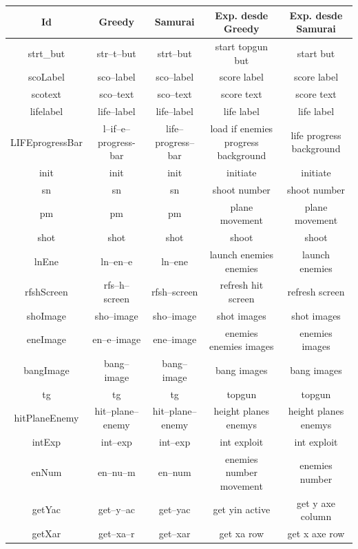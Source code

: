 \begin{table}
		\centering
   		\begin{tabular}{| c | c | c | c | c |}     
   		
       \hline
  	   \textbf{Id} & \textbf{Greedy} & \textbf{Samurai} & \textbf{Exp. desde Greedy} & \textbf{Exp. desde Samurai} \\ \hline
strt\_but&str--t--but&strt--but&start topgun but&start but\\ \hline
scoLabel&sco--label&sco--label&score label&score label\\ \hline
scotext&sco--text&sco--text&score text&score text\\ \hline
lifelabel&life--label&life--label&life label&life label\\ \hline
LIFEprogressBar&l--if--e--progress-bar&life--progress--bar& \shortstack{load if enemies\\progress background}&life progress background \\ \hline
init&init&init&initiate&initiate\\ \hline
sn&sn&sn&shoot number&shoot number\\ \hline
pm&pm&pm&plane movement&plane movement\\ \hline
shot&shot&shot&shoot&shoot\\ \hline
lnEne&ln--en--e&ln--ene&launch enemies enemies&launch enemies\\ \hline
rfshScreen&rfs--h--screen&rfsh--screen&refresh hit screen&refresh screen\\ \hline
shoImage&sho--image&sho--image&shot images&shot images\\ \hline
eneImage&en--e--image&ene--image&enemies enemies images&enemies images\\ \hline
bangImage&bang--image&bang--image&bang images&bang images\\ \hline
tg&tg&tg&topgun&topgun\\ \hline
hitPlaneEnemy&hit--plane--enemy&hit--plane--enemy&height planes enemys&height planes enemys\\ \hline
intExp&int--exp&int--exp&int exploit&int exploit\\ \hline
enNum&en--nu--m&en--num&enemies number movement&enemies number\\ \hline
getYac&get--y--ac&get--yac&get yin active&get y axe column\\ \hline
getXar&get--xa--r&get--xar&get xa row&get x axe row\\ \hline

\end{tabular}
\end{table}
